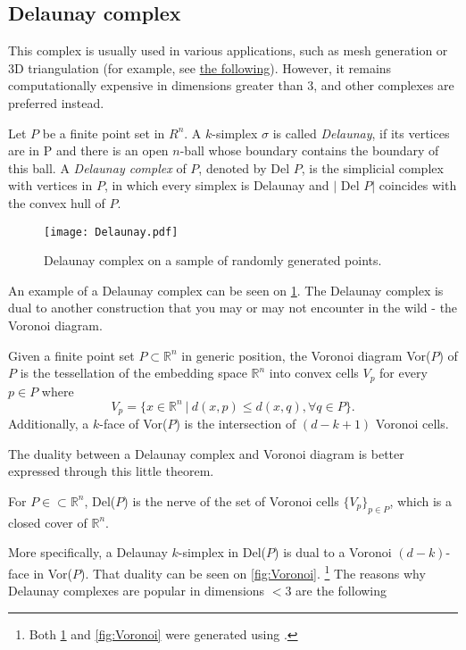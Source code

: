 \subsection{Delaunay complex}

This complex is usually used in various applications, such as mesh generation or 3D triangulation (for example, see \href{https://doc.cgal.org/latest/Manual/packages.html#PartTriangulationsAndDelaunayTriangulations}{the following}). However, it remains computationally expensive in dimensions greater than 3, and other complexes are preferred instead.

\begin{definition}
Let $P$ be a finite point set in $R^{n}$. A $k$-simplex $\sigma$ is called \textit{Delaunay}, if its vertices are in P and there is an open $n$-ball whose boundary contains the boundary of this ball. A \textit{Delaunay complex} of $P$, denoted by Del $P$, is the simplicial complex with vertices in $P$, in which every simplex is Delaunay and $\vert$ Del $P \vert$ coincides with the convex hull of $P$.
\end{definition}

\begin{figure}[h!]
  \centering
  \texttt{[image: Delaunay.pdf]}
  \caption{Delaunay complex on a sample of randomly generated points.}
  \label{fig:Delaunay}
\end{figure}

An example of a Delaunay complex can be seen on \ref{fig:Delaunay}. The Delaunay complex is dual to another construction that you may or may not encounter in the wild - the Voronoi diagram.

\begin{definition}
  Given a finite point set $P \subset \mathbb{R}^{n}$ in generic position, the Voronoi diagram Vor($P$) of $P$ is the tessellation of the embedding space $\mathbb{R}^{n}$ into convex cells $V_{p}$ for every $p \in P$ where
  \begin{equation*}
    V_{p} = \{x \in \mathbb{R}^{n} \: \vert \: d(x,p) \leq d(x,q), \forall q \in P\}.
  \end{equation*}
  Additionally, a $k$-face of Vor($P$) is the intersection of $(d-k+1)$ Voronoi cells.
\end{definition}

The duality between a Delaunay complex and Voronoi diagram is better expressed through this little theorem.
\begin{theorem}
  For $P \in \subset \mathbb{R}^{n}$, Del($P$) is the nerve of the set of Voronoi cells $\{V_{p}\}_{p \in P}$, which is a closed cover of $\mathbb{R}^{n}$.
\end{theorem}
More specifically, a Delaunay $k$-simplex in Del($P$) is dual to a Voronoi $(d-k)$-face in Vor($P$). That duality can be seen on \ref{fig:Voronoi}.
\footnote{Both \ref{fig:Delaunay} and \ref{fig:Voronoi} were generated using \cite{2020SciPy-NMeth}.}
The reasons why Delaunay complexes are popular in dimensions $<3$ are the following

